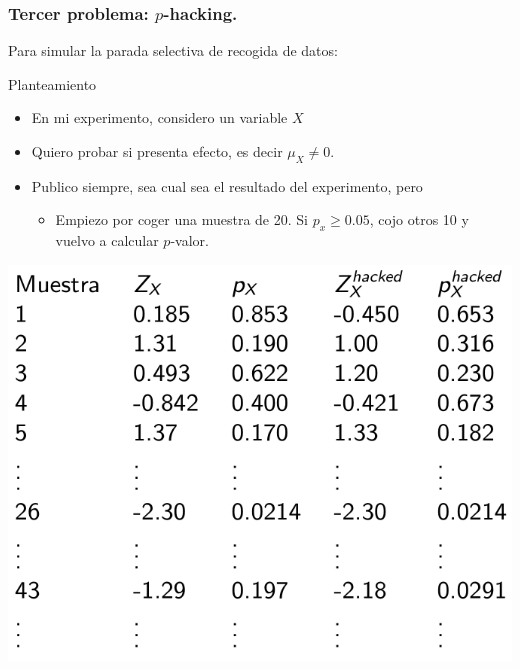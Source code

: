 \documentclass[9pt]{beamer}
\begin{document}
\begin{frame}
  \frametitle{Tercer problema: $p$-hacking.}
  Para simular la parada selectiva de recogida de datos:\\ 
  \begin{block}{Planteamiento}
    \begin{itemize}
    \item     En mi experimento, considero un variable $X$ 
    \item Quiero probar si presenta efecto, es decir $\mu_X \neq 0$.
    \item   Publico siempre, sea cual sea el resultado del
      experimento, pero
      \begin{itemize}
      \item Empiezo por coger una muestra de 20. Si  $p_x \geq 0.05$,
        cojo otros 10 y vuelvo a calcular $p$-valor.
      \end{itemize}
    \end{itemize}

  \end{block}
  \begin{center}

    \includegraphics[width=0.5\linewidth]{images/select_size-1} 
  \end{center}
\end{frame}
\end{document}
